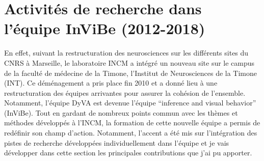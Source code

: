 \documentclass[11pt,french,a4paper,oneside]{article}%
\begin{document}
\section{Activités de recherche dans l'équipe InViBe (2012-2018)}
\label{sec:invibe}%



En effet, suivant la restructuration des neurosciences sur les différents sites du CNRS à Marseille, le laboratoire INCM a intégré un nouveau site sur le campus de la faculté de médecine de la Timone, l'Institut de Neurosciences de la Timone (INT). Ce déménagement a pris place fin 2010 et a donné lieu à une restructuration des équipes arrivantes pour assurer la cohésion de l'ensemble. Notamment, l'équipe DyVA est devenue l'équipe ``inference and visual behavior'' ({\sc InViBe}). Tout en gardant de nombreux points commun avec les thèmes et méthodes développés à l'INCM, la formation de cette nouvelle équipe a permis de redéfinir son champ d'action. Notamment, l'accent a été mis sur l'intégration des pistes de recherche développées individuellement dans l'équipe et je vais développer dans cette section les principales contributions que j'ai pu apporter. %
\end{document}
